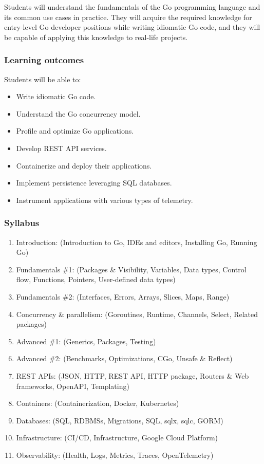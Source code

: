 \documentclass[
  digital,
  color,
  oneside,
  nosansbold,
  nocolorbold,
  nolof,
  nolot,
]{fithesis4}
\begin{document}
Students will understand the fundamentals of the Go programming language and its common use cases in practice. They will acquire the required knowledge for entry-level Go developer positions while writing idiomatic Go code, and they will be capable of applying this knowledge to real-life projects.

\subsubsection{Learning outcomes}

Students will be able to:
\begin{itemize}
    \item Write idiomatic Go code.
    \item Understand the Go concurrency model.
    \item Profile and optimize Go applications.
    \item Develop REST API services.
    \item Containerize and deploy their applications.
    \item Implement persistence leveraging SQL databases.
    \item Instrument applications with various types of telemetry.
\end{itemize}

\subsubsection{Syllabus}

\begin{enumerate}
    \item Introduction: (Introduction to Go, IDEs and editors, Installing Go, Running Go)
    \item Fundamentals \#1: (Packages \& Visibility, Variables, Data types, Control flow, Functions, Pointers, User-defined data types)
    \item Fundamentals \#2: (Interfaces, Errors, Arrays, Slices, Maps, Range)
    \item Concurrency \& parallelism: (Goroutines, Runtime, Channels, Select, Related packages)
    \item Advanced \#1: (Generics, Packages, Testing)
    \item Advanced \#2: (Benchmarks, Optimizations, CGo, Unsafe \& Reflect)
    \item REST APIs: (JSON, HTTP, REST API, HTTP package, Routers \& Web frameworks, OpenAPI, Templating)
    \item Containers: (Containerization, Docker, Kubernetes)
    \item Databases: (SQL, RDBMSs, Migrations, SQL, sqlx, sqlc, GORM)
    \item Infrastructure: (CI/CD, Infrastructure, Google Cloud Platform)
    \item Observability: (Health, Logs, Metrics, Traces, OpenTelemetry)
\end{enumerate}
\end{document}
